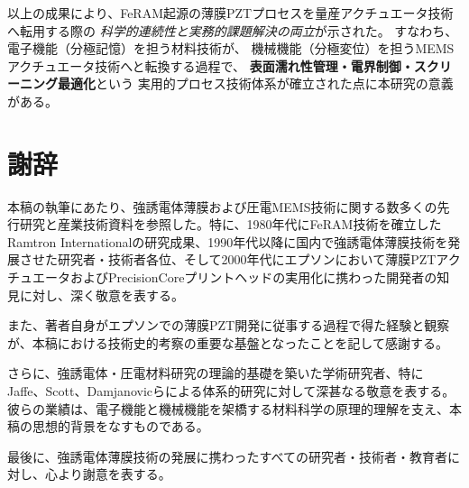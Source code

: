 \documentclass[conference]{IEEEtran}
\begin{document}
\medskip
以上の成果により、FeRAM起源の薄膜PZTプロセスを量産アクチュエータ技術へ転用する際の
\emph{科学的連続性と実務的課題解決の両立}が示された。
すなわち、電子機能（分極記憶）を担う材料技術が、
機械機能（分極変位）を担うMEMSアクチュエータ技術へと転換する過程で、
\textbf{表面濡れ性管理・電界制御・スクリーニング最適化}という
実用的プロセス技術体系が確立された点に本研究の意義がある。

\section*{謝辞}
本稿の執筆にあたり、強誘電体薄膜および圧電MEMS技術に関する数多くの先行研究と産業技術資料を参照した。特に、1980年代にFeRAM技術を確立したRamtron Internationalの研究成果、1990年代以降に国内で強誘電体薄膜技術を発展させた研究者・技術者各位、そして2000年代にエプソンにおいて薄膜PZTアクチュエータおよびPrecisionCoreプリントヘッドの実用化に携わった開発者の知見に対し、深く敬意を表する。

また、著者自身がエプソンでの薄膜PZT開発に従事する過程で得た経験と観察が、本稿における技術史的考察の重要な基盤となったことを記して感謝する。

さらに、強誘電体・圧電材料研究の理論的基礎を築いた学術研究者、特にJaffe、Scott、Damjanovicらによる体系的研究に対して深甚なる敬意を表する。彼らの業績は、電子機能と機械機能を架橋する材料科学の原理的理解を支え、本稿の思想的背景をなすものである。

最後に、強誘電体薄膜技術の発展に携わったすべての研究者・技術者・教育者に対し、心より謝意を表する。
\end{document}

